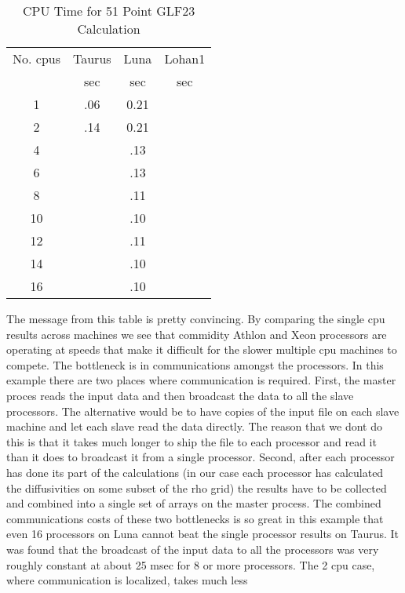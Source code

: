 \documentclass[12pt]{article}
\begin{document}
  \begin{table}
      \begin{center}
     \begin{tabular}
      {cccc}
      No.  cpus & Taurus & Luna & Lohan1 \\ 
         & sec &sec &sec\\ \hline
        1 & .06 & 0.21&   \\
        2 & .14 & 0.21& \\
        4 &     & .13 & \\
        6 &     & .13 & \\
        8 &     & .11 & \\
       10 &     & .10 & \\
       12 &     & .11 & \\ 
       14 &     & .10 & \\
       16 &     & .10 & \\ \hline
    \end{tabular}
   \end{center}
     \caption{CPU Time for 51 Point GLF23 Calculation}
  \end{table}
   The message from  this table is pretty convincing. By comparing
  the single cpu results across machines we see that  commidity
   Athlon and Xeon processors  are operating at speeds that make
   it difficult for the slower  multiple cpu  machines to compete.
  The bottleneck is in communications amongst the processors. In this
  example there are two  places where communication is
 required. First, the master proces reads the input data and then
  broadcast the data  to all the slave processors. {The
 alternative would be to have copies of the input file on each slave
 machine and let each slave read the data directly. The reason that we
 dont do this is that it takes much longer to ship the file to each
 processor and read it than it does to broadcast it from a single
 processor.} Second, after each processor has done its part of the
calculations (in our case each processor has calculated the
diffusivities on some subset of the rho grid) the results have to be
collected and combined into a single set of arrays on the master process.
  The combined communications costs of these two bottlenecks 
  is so great in this example that even
  16 processors on Luna cannot beat the single processor results
 on Taurus. It was found  that the broadcast of the input data to all 
 the processors was very roughly constant at about 25 msec 
 for 8 or more processors.
 The  2 cpu case, where communication is localized, takes much less
\end{document}
